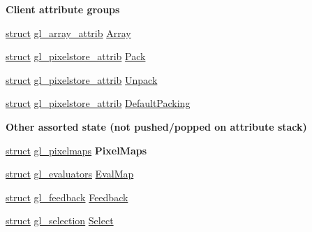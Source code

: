 \begin{Indent}\textbf{ Client attribute groups}\par
\begin{DoxyCompactItemize}
\item 
\hyperlink{interfacestruct}{struct} \hyperlink{structgl__array__attrib}{gl\+\_\+array\+\_\+attrib} \hyperlink{structgl__context_a7612fcdb4163ab4dca31937f78adb826}{Array}
\item 
\hyperlink{interfacestruct}{struct} \hyperlink{structgl__pixelstore__attrib}{gl\+\_\+pixelstore\+\_\+attrib} \hyperlink{structgl__context_a5ccb9b34c3177329f8bfc758161c60a2}{Pack}
\item 
\hyperlink{interfacestruct}{struct} \hyperlink{structgl__pixelstore__attrib}{gl\+\_\+pixelstore\+\_\+attrib} \hyperlink{structgl__context_aa7be6bf26321340cd2fcb3857c2756b6}{Unpack}
\item 
\hyperlink{interfacestruct}{struct} \hyperlink{structgl__pixelstore__attrib}{gl\+\_\+pixelstore\+\_\+attrib} \hyperlink{structgl__context_a63ee4ec4dd075917d69cf89339f82761}{Default\+Packing}
\end{DoxyCompactItemize}
\end{Indent}
\begin{Indent}\textbf{ Other assorted state (not pushed/popped on attribute stack)}\par
\begin{DoxyCompactItemize}
\item 
\mbox{\label{structgl__context_a16c718edec0b9b308b2738f357ca8dc2}} 
\hyperlink{interfacestruct}{struct} \hyperlink{structgl__pixelmaps}{gl\+\_\+pixelmaps} {\bfseries Pixel\+Maps}
\item 
\hyperlink{interfacestruct}{struct} \hyperlink{structgl__evaluators}{gl\+\_\+evaluators} \hyperlink{structgl__context_a646761ec5a56ceff5d3815733fc99fc1}{Eval\+Map}
\item 
\hyperlink{interfacestruct}{struct} \hyperlink{structgl__feedback}{gl\+\_\+feedback} \hyperlink{structgl__context_a95b4746db6881392cca9b3580c0e21a9}{Feedback}
\item 
\hyperlink{interfacestruct}{struct} \hyperlink{structgl__selection}{gl\+\_\+selection} \hyperlink{structgl__context_aef69cddd9306ad3101ee239a5c9b76e1}{Select}
\end{DoxyCompactItemize}
\end{Indent}
